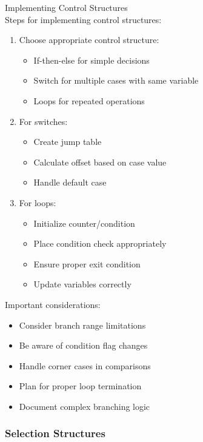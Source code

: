 \begin{KR}{Implementing Control Structures}\\
Steps for implementing control structures:
\begin{enumerate}
  \item Choose appropriate control structure:
    \begin{itemize}
      \item If-then-else for simple decisions
      \item Switch for multiple cases with same variable
      \item Loops for repeated operations
    \end{itemize}
  \item For switches:
    \begin{itemize}
      \item Create jump table
      \item Calculate offset based on case value
      \item Handle default case
    \end{itemize}
  \item For loops:
    \begin{itemize}
      \item Initialize counter/condition
      \item Place condition check appropriately
      \item Ensure proper exit condition
      \item Update variables correctly
    \end{itemize}
\end{enumerate}
\end{KR}

\begin{remark}
Important considerations:
\begin{itemize}
  \item Consider branch range limitations
  \item Be aware of condition flag changes
  \item Handle corner cases in comparisons
  \item Plan for proper loop termination
  \item Document complex branching logic
\end{itemize}
\end{remark}

\columnbreak


\subsubsection{Selection Structures}


